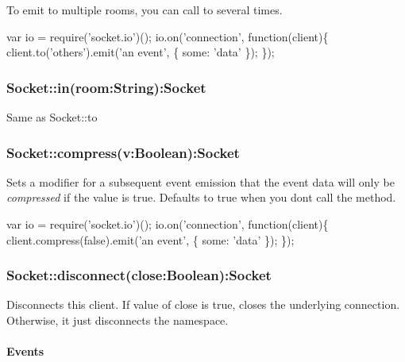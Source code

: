 To emit to multiple rooms, you can call {\ttfamily to} several times.


\begin{DoxyCode}
var io = require('socket.io')();
io.on('connection', function(client)\{
  client.to('others').emit('an event', \{ some: 'data' \});
\});
\end{DoxyCode}


\subsubsection*{Socket\+::in(room\+:\+String)\+:Socket}

Same as {\ttfamily Socket\+::to}

\subsubsection*{Socket\+::compress(v\+:\+Boolean)\+:Socket}

Sets a modifier for a subsequent event emission that the event data will only be {\itshape compressed} if the value is {\ttfamily true}. Defaults to {\ttfamily true} when you don\textquotesingle{}t call the method.


\begin{DoxyCode}
var io = require('socket.io')();
io.on('connection', function(client)\{
  client.compress(false).emit('an event', \{ some: 'data' \});
\});
\end{DoxyCode}


\subsubsection*{Socket\+::disconnect(close\+:\+Boolean)\+:Socket}

Disconnects this client. If value of close is {\ttfamily true}, closes the underlying connection. Otherwise, it just disconnects the namespace.

\paragraph*{Events}


